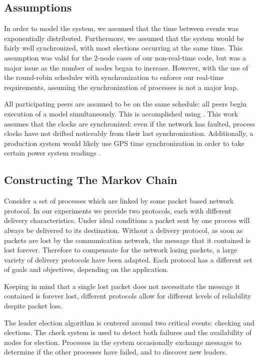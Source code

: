\subsection{Assumptions}
In order to model the system, we assumed that the time between events was 
exponentially distributed. Furthermore, we assumed that the system would be
fairly well synchronized, with most elections occurring at the same time. This
assumption was valid for the 2-node cases of our non-real-time code, but was
a major issue as the number of nodes began to increase. However, with
the use of the round-robin scheduler with synchronization to enforce our
real-time requirements, assuming the synchronization of processes is not a
major leap.

All participating peers are assumed to be on the same schedule: all
peers begin execution of a model simultaneously. This is accomplished using \cite{DCS}.
This work assumes that the clocks are synchronized: even if the network has faulted,
process clocks have not drifted noticeably from their last synchronization. Additionally,
a production system would likely use GPS time synchronization in order to take
certain power system readings \cite{PHASORREADINGS}.

\subsection{Constructing The Markov Chain}

Consider a set of processes which are linked by some packet based network
protocol. In our experiments we provide two protocols, each with different
delivery characteristics. Under ideal conditions a packet sent by one process
will always be delivered to its destination. Without a delivery protocol, as
soon as packets are lost by the communication network, the message that it
contained is lost forever. Therefore to compensate for the network losing
packets, a large variety of delivery protocols have been adapted. Each protocol
has a different set of goals and objectives, depending on the application.

Keeping in mind that a single lost packet does not necessitate the message it
contained is forever lost, different protocols allow for different levels of
reliability despite packet loss.

The leader election algorithm is centered around two critical events: checking
and elections. The check system is used to detect both failures and the
availability of nodes for election. Processes in the system occasionally exchange 
messages to determine if the other processes have failed, and to discover new
leaders. 

